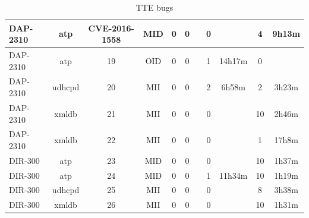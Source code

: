 \begin{table}[ht]
\begin{tabular}{|l||c|c|c|c|c|c|c|c|c|c|}
\hline
DAP-2310 & atp & CVE-2016-1558 & MID & 0 & 0 &  & 0 &  & 4 & 9h13m \\
\hline
DAP-2310 & atp & 19 & OID & 0 & 0 &  & 1 & 14h17m & 0 &  \\
\hline
DAP-2310 & udhcpd & 20 & MII & 0 & 0 &  & 2 & 6h58m & 2 & 3h23m \\
\hline
DAP-2310 & xmldb & 21 & MII & 0 & 0 &  & 0 &  & 10 & 2h46m \\
\hline
DAP-2310 & xmldb & 22 & MII & 0 & 0 &  & 0 &  & 1 & 17h8m \\
\hline
DIR-300 & atp & 23 & MID & 0 & 0 &  & 0 &  & 10 & 1h37m \\
\hline
DIR-300 & atp & 24 & MID & 0 & 0 &  & 1 & 11h34m & 10 & 1h19m \\
\hline
DIR-300 & udhcpd & 25 & MII & 0 & 0 &  & 0 &  & 8 & 3h38m \\
\hline
DIR-300 & xmldb & 26 & MII & 0 & 0 &  & 0 &  & 10 & 1h31m \\
\hline
\end{tabular}
\caption{TTE bugs}
\end{table}
